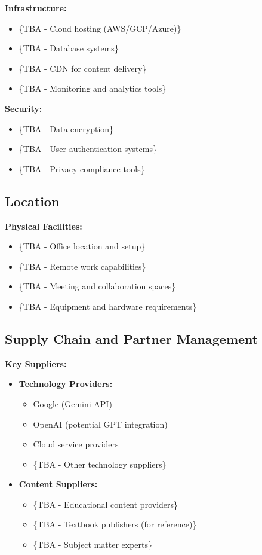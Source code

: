 \textbf{Infrastructure:}
\begin{itemize}
    \item \{TBA - Cloud hosting (AWS/GCP/Azure)\}
    \item \{TBA - Database systems\}
    \item \{TBA - CDN for content delivery\}
    \item \{TBA - Monitoring and analytics tools\}
\end{itemize}

\textbf{Security:}
\begin{itemize}
    \item \{TBA - Data encryption\}
    \item \{TBA - User authentication systems\}
    \item \{TBA - Privacy compliance tools\}
\end{itemize}

\subsection{Location}
\textbf{Physical Facilities:}
\begin{itemize}
    \item \{TBA - Office location and setup\}
    \item \{TBA - Remote work capabilities\}
    \item \{TBA - Meeting and collaboration spaces\}
    \item \{TBA - Equipment and hardware requirements\}
\end{itemize}

\subsection{Supply Chain and Partner Management}
\textbf{Key Suppliers:}
\begin{itemize}
    \item \textbf{Technology Providers:}
    \begin{itemize}
        \item Google (Gemini API)
        \item OpenAI (potential GPT integration)
        \item Cloud service providers
        \item \{TBA - Other technology suppliers\}
    \end{itemize}
    \item \textbf{Content Suppliers:}
    \begin{itemize}
        \item \{TBA - Educational content providers\}
        \item \{TBA - Textbook publishers (for reference)\}
        \item \{TBA - Subject matter experts\}
    \end{itemize}
\end{itemize}

